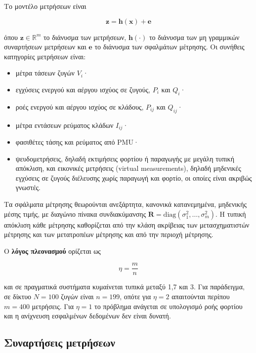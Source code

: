 Το μοντέλο μετρήσεων είναι

\begin{equation}
\mathbf{z} = \mathbf{h}(\mathbf{x}) + \mathbf{e}
\label{eq:measmodel}
\end{equation}

όπου $\mathbf{z} \in \mathbb{R}^{m}$ το διάνυσμα των μετρήσεων, $\mathbf{h}(\cdot)$ το
διάνυσμα των μη γραμμικών συναρτήσεων μετρήσεων και $\mathbf{e}$ το διάνυσμα των σφαλμάτων
μέτρησης. Οι συνήθεις κατηγορίες μετρήσεων είναι:

\begin{itemize}
\item μέτρα τάσεων ζυγών $V_i$·
\item εγχύσεις ενεργού και αέργου ισχύος σε ζυγούς, $P_i$ και $Q_i$·
\item ροές ενεργού και αέργου ισχύος σε κλάδους, $P_{ij}$ και $Q_{ij}$·
\item μέτρα εντάσεων ρεύματος κλάδων $I_{ij}$·
\item φασιθέτες τάσης και ρεύματος από PMU·
\item ψευδομετρήσεις, δηλαδή εκτιμήσεις φορτίου ή παραγωγής με μεγάλη τυπική απόκλιση, και
      εικονικές μετρήσεις (virtual measurements), δηλαδή μηδενικές εγχύσεις σε ζυγούς
      διέλευσης χωρίς παραγωγή και φορτίο, οι οποίες είναι ακριβώς γνωστές.
\end{itemize}

Τα σφάλματα μέτρησης θεωρούνται ανεξάρτητα, κανονικά κατανεμημένα, μηδενικής μέσης τιμής, με
διαγώνιο πίνακα συνδιακύμανσης $\mathbf{R} = \mathrm{diag}(\sigma_1^2, \ldots, \sigma_m^2)$. Η
τυπική απόκλιση κάθε μέτρησης καθορίζεται από την κλάση ακρίβειας των μετασχηματιστών μέτρησης
και των μετατροπέων μέτρησης και από την περιοχή μέτρησης.

Ο \textbf{λόγος πλεονασμού} ορίζεται ως

\begin{equation}
\eta = \frac{m}{n}
\label{eq:redundancy}
\end{equation}

και σε πραγματικά συστήματα κυμαίνεται τυπικά μεταξύ 1,7 και 3. Για παράδειγμα, σε δίκτυο
$N = 100$ ζυγών είναι $n = 199$, οπότε για $\eta = 2$ απαιτούνται περίπου $m = 400$
μετρήσεις. Για $\eta = 1$ το πρόβλημα ανάγεται σε υπολογισμό ροής φορτίου και η ανίχνευση
εσφαλμένων δεδομένων δεν είναι δυνατή.

\subsection{Συναρτήσεις μετρήσεων}

